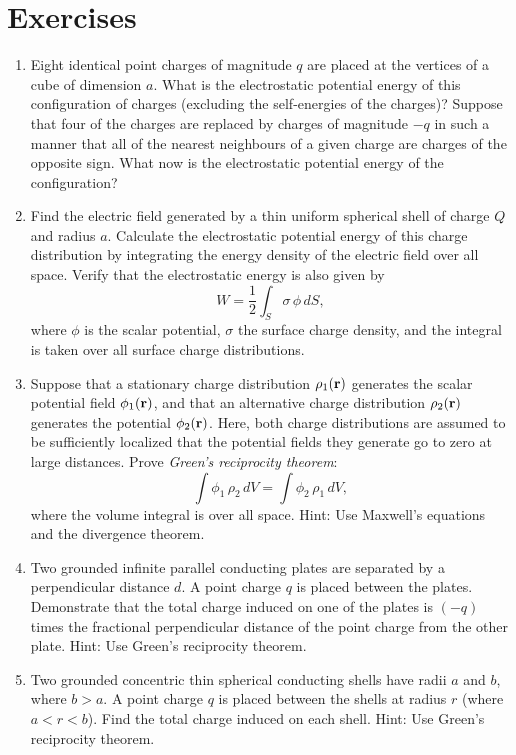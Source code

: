 {\small
\section{Exercises}
\renewcommand{\theenumi}{5.\arabic{enumi}}
\begin{enumerate}
\item Eight identical point charges of magnitude $q$ are placed at the vertices of a cube of dimension $a$. What is the electrostatic potential
energy of this configuration of charges (excluding the self-energies of
the charges)? Suppose that four of the charges are replaced by
charges of magnitude $-q$ in such a manner that all of the nearest neighbours
of a given charge are charges of the opposite sign. What now
is the electrostatic potential energy of the configuration?
\item Find the electric field generated by a thin uniform spherical shell
of charge $Q$ and radius $a$. Calculate the electrostatic potential
energy of this charge distribution by integrating the energy density of the
electric field over all space. Verify that the electrostatic energy is
also given by
$$
W=\frac{1}{2}\int_S \sigma\,\phi\,dS,
$$
where $\phi$ is the scalar potential, $\sigma$ the surface charge density,
and the integral is taken over all surface charge distributions.
\item Suppose that a stationary charge distribution $\rho_1({\bf r})$
generates the scalar potential field $\phi_1({\bf r})$, and that an alternative charge
distribution $\rho_2({\bf r})$ generates the  potential  $\phi_2({\bf r})$. Here, both charge distributions are assumed to be sufficiently localized that the
potential fields they generate go to zero at large distances. Prove {\em Green's
reciprocity theorem}:
$$
\int\phi_1\,\rho_2\,dV = \int \phi_2\,\rho_1\,dV,
$$
where the volume integral is over all space.
Hint: Use Maxwell's equations and the divergence theorem.
\item Two  grounded infinite parallel conducting plates are separated by a
perpendicular distance $d$. A point charge $q$ is placed between the plates.
Demonstrate  that the total charge induced on one of the plates
is $(-q)$ times the fractional perpendicular distance of the point charge
from the other plate. Hint: Use Green's reciprocity theorem.
\item Two  grounded concentric thin spherical conducting shells
have radii $a$ and $b$, where $b>a$.  A point charge $q$ is placed between the shells at radius $r$ (where $a< r< b$).  Find the total
charge induced on each shell. Hint: Use Green's reciprocity theorem.

\end{enumerate}}
